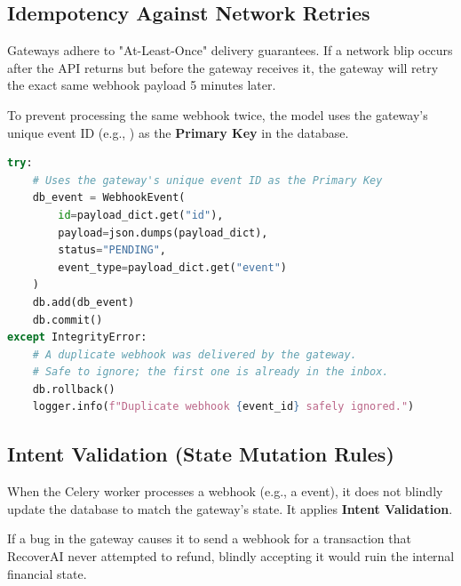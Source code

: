 \vspace{0.8cm}

\subsection{Idempotency Against Network Retries}

Gateways adhere to "At-Least-Once" delivery guarantees. If a network blip occurs after the API returns  but before the gateway receives it, the gateway will retry the exact same webhook payload 5 minutes later.

To prevent processing the same webhook twice, the  model uses the gateway's unique event ID (e.g., ) as the \textbf{Primary Key} in the database.

\begin{tcolorbox}[codebox={Webhook Idempotency (\filepath{app/api/webhooks.py})}]
\begin{lstlisting}[language=Python]
try:
    # Uses the gateway's unique event ID as the Primary Key
    db_event = WebhookEvent(
        id=payload_dict.get("id"),  
        payload=json.dumps(payload_dict),
        status="PENDING",
        event_type=payload_dict.get("event")
    )
    db.add(db_event)
    db.commit()
except IntegrityError:
    # A duplicate webhook was delivered by the gateway.
    # Safe to ignore; the first one is already in the inbox.
    db.rollback()
    logger.info(f"Duplicate webhook {event_id} safely ignored.")
\end{lstlisting}
\end{tcolorbox}

\vspace{0.8cm}

\subsection{Intent Validation (State Mutation Rules)}

When the Celery worker processes a webhook (e.g., a  event), it does not blindly update the database to match the gateway's state. It applies \textbf{Intent Validation}.

\begin{tcolorbox}[warningbox={\iconWarning[1.3] Defending Against Rogue Webhooks}]
If a bug in the gateway causes it to send a  webhook for a transaction that RecoverAI never attempted to refund, blindly accepting it would ruin the internal financial state.
\end{tcolorbox}

